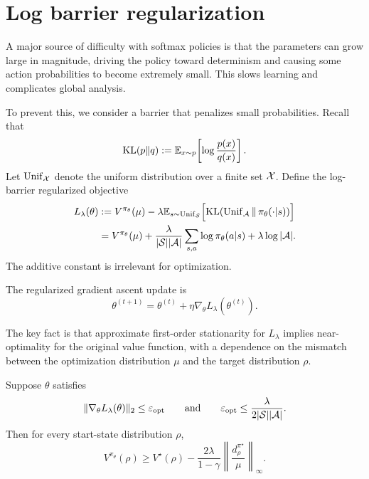 \section{Log barrier regularization}

A major source of difficulty with softmax policies is that the parameters can grow large in
magnitude, driving the policy toward determinism and causing some action probabilities to become
extremely small. This slows learning and complicates global analysis.

To prevent this, we consider a barrier that penalizes small probabilities. Recall that
\[
\mathrm{KL}(p\|q)
:=
\mathbb{E}_{x\sim p}\!\left[\log \frac{p(x)}{q(x)}\right].
\]
Let $\mathrm{Unif}_{\mathcal{X}}$ denote the uniform distribution over a finite set $\mathcal{X}$.
Define the log-barrier regularized objective
\begin{align}
L_\lambda(\theta)
&:=
V^{\pi_\theta}(\mu)
-
\lambda \mathbb{E}_{s\sim \mathrm{Unif}_{\mathcal{S}}}
\Big[\mathrm{KL}(\mathrm{Unif}_{\mathcal{A}} \,\|\, \pi_\theta(\cdot|s))\Big] \nonumber\\
&=
V^{\pi_\theta}(\mu)
+
\frac{\lambda}{|\mathcal{S}||\mathcal{A}|}
\sum_{s,a} \log \pi_\theta(a|s)
+
\lambda \log |\mathcal{A}|.
\label{eqn:loss-reg}
\end{align}
The additive constant is irrelevant for optimization.

The regularized gradient ascent update is
\begin{equation}\label{eqn:gd-entropic}
\theta^{(t+1)}=\theta^{(t)}+\eta \nabla_\theta L_\lambda(\theta^{(t)}).
\end{equation}

The key fact is that approximate first-order stationarity for $L_\lambda$ implies
near-optimality for the original value function, with a dependence on the mismatch
between the optimization distribution $\mu$ and the target distribution $\rho$.

\begin{theorem}
\label{thm:small-gradient}
Suppose $\theta$ satisfies
\[
\|\nabla_\theta L_\lambda(\theta)\|_2 \le \varepsilon_{\mathrm{opt}}
\qquad\text{and}\qquad
\varepsilon_{\mathrm{opt}} \le \frac{\lambda}{2|\mathcal{S}||\mathcal{A}|}.
\]
Then for every start-state distribution $\rho$,
\[
V^{\pi_\theta}(\rho)
\ge
V^\star(\rho)
-
\frac{2\lambda}{1-\gamma}
\left\|
\frac{d_\rho^{\pi^\star}}{\mu}
\right\|_\infty.
\]
\end{theorem}

